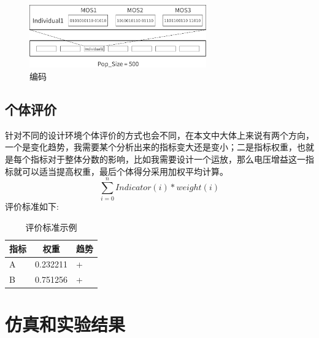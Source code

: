 \documentclass[14pt, a4paper]{article}
\begin{document}
        \begin{figure}[htbp]
            \centering
            \includegraphics[width= 3in]{fig/encoding_black.png}
            \caption{编码}
            \label{fig3}
        \end{figure}
    \subsection{个体评价}
        针对不同的设计环境个体评价的方式也会不同，在本文中大体上来说有两个方向，一个是变化趋势，我需要某个分析出来的指标变大还是变小；二是指标权重，也就是每个指标对于整体分数的影响，比如我需要设计一个运放，那么电压增益这一指标就可以适当提高权重，最后个体得分采用加权平均计算。
        $$\sum_{i=0}^{n} Indicator(i) * weight(i)$$
        评价标准如下:
        \begin{table}[htbp]
            \centering
            \begin{tabular}{lcl}
                \toprule
                指标 & 权重 & 趋势 \\
                \midrule
                A & 0.232211 & + \\
                B & 0.751256 & + \\
                \bottomrule
            \end{tabular}
            \caption{评价标准示例}
        \end{table}
\section{仿真和实验结果}
\end{document}
